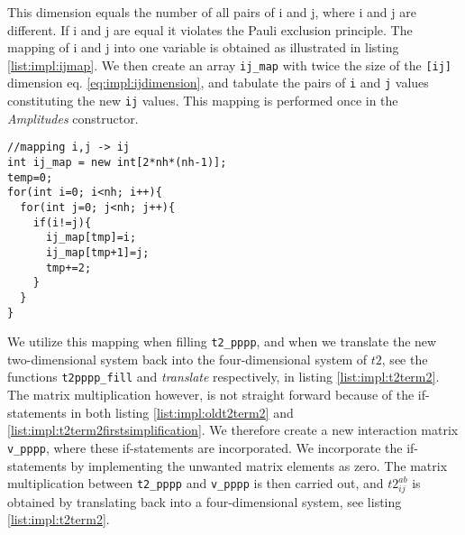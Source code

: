 This dimension equals the number of all pairs of i and j, where i and j are different. If i and j are equal it violates the Pauli exclusion principle. The mapping of i and j into one variable is obtained as illustrated in listing \ref{list:impl:ijmap}. We then create an array \texttt{ij\_map} with twice the size of the \texttt{[ij]} dimension eq. \ref{eq:impl:ijdimension}, and tabulate the pairs of \texttt{i} and \texttt{j} values constituting the new \texttt{ij} values. This mapping is performed once in the \emph{Amplitudes} constructor.
\begin{lstlisting}[label={list:impl:ijmap},caption={illustrates the map of the two quantum numbers i,j into one number ij}]
//mapping i,j -> ij  
int ij_map = new int[2*nh*(nh-1)];
temp=0;
for(int i=0; i<nh; i++){
  for(int j=0; j<nh; j++){
    if(i!=j){
      ij_map[tmp]=i;
      ij_map[tmp+1]=j;
      tmp+=2;
    }
  }
}
\end{lstlisting}
We utilize this mapping when filling \texttt{t2\_pppp}, and when we translate the new two-dimensional system back into the four-dimensional system of $t2$, see the functions \texttt{t2pppp\_fill} and \emph{translate} respectively, in listing \ref{list:impl:t2term2}. The matrix multiplication however, is not straight forward because of the if-statements in both listing \ref{list:impl:oldt2term2} and \ref{list:impl:t2term2firstsimplification}. We therefore create a new interaction matrix \texttt{v\_pppp}, where these if-statements are incorporated. We incorporate the if-statements by implementing the unwanted matrix elements as zero. The matrix multiplication between \texttt{t2\_pppp} and \texttt{v\_pppp} is then carried out, and $t2_{ij}^{ab}$ is obtained by translating back into a four-dimensional system, see listing \ref{list:impl:t2term2}.

